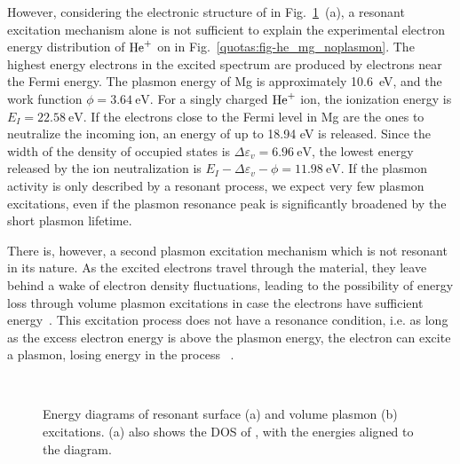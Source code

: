 \begin{refsection}
However, considering the electronic structure of  in Fig.~\ref{quotas:fig-plasmons}~(a), a resonant 
excitation mechanism alone is not sufficient to explain the experimental 
electron energy distribution of $\ce{He^+}$ on  in 
Fig.~\ref{quotas:fig-he_mg_noplasmon}. The highest energy electrons in the 
excited spectrum are produced by electrons near the Fermi energy. The plasmon 
energy of Mg is approximately 10.6~\si{\electronvolt}, and the work function 
$\phi = 3.64~\si{\electronvolt}$. For a singly charged $\ce{He^+}$ 
ion, the ionization energy is $E_I = 22.58~\si{\electronvolt}$. If the electrons close 
to the Fermi level in Mg are the ones to neutralize the incoming ion, an 
energy of up to 18.94 eV is released. Since the width of the density of 
occupied states is $\Delta \varepsilon_{v} = 6.96~\si{\electronvolt}$, the 
lowest energy released by the ion neutralization is $E_I - \Delta\varepsilon_{v} - \phi = 11.98~\si{\electronvolt}$. 
If the plasmon activity is only described by a resonant 
process, we expect very few plasmon excitations, even if the plasmon 
resonance peak is significantly broadened by the short plasmon lifetime.

There is, however, a second plasmon excitation mechanism which is not 
resonant in its nature. As the excited electrons travel through the material, 
they leave behind a wake of electron density fluctuations, leading to the 
possibility of energy loss through volume plasmon excitations in case the 
electrons have sufficient energy~\cite{Ritchie1957}. This excitation process does not have a 
resonance condition, i.e. as long as the excess electron energy is above the 
plasmon energy, the electron can excite a plasmon, losing energy in the process 
~\cite{Baragiola2001}.

\begin{figure}[ht] 
    \centering 
    \captionsetup{width=0.9\textwidth}
    \begin{subfigure}[t]{0.6\textwidth} 
        \centering 
        
         
        \caption{} 
    \end{subfigure}%
    ~  
    \begin{subfigure}[t]{0.4\textwidth} 
        \centering 
        
         
        \caption{} 
    \end{subfigure} 
\caption{Energy diagrams of resonant surface (a) and volume plasmon (b) 
excitations. (a) also shows the \gls{DOS} of , with the energies 
aligned to the diagram.} 
\label{quotas:fig-plasmons} 
\end{figure} 
 

\end{refsection}
